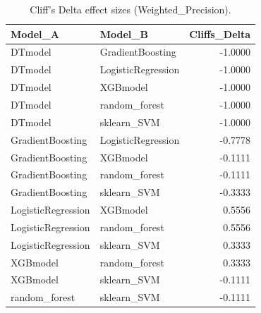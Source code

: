\begin{table}[t]
\centering
\begin{tabular}{llr}
\toprule
Model_A & Model_B & Cliffs_Delta \\
\midrule
DTmodel & GradientBoosting & -1.0000 \\
DTmodel & LogisticRegression & -1.0000 \\
DTmodel & XGBmodel & -1.0000 \\
DTmodel & random_forest & -1.0000 \\
DTmodel & sklearn_SVM & -1.0000 \\
GradientBoosting & LogisticRegression & -0.7778 \\
GradientBoosting & XGBmodel & -0.1111 \\
GradientBoosting & random_forest & -0.1111 \\
GradientBoosting & sklearn_SVM & -0.3333 \\
LogisticRegression & XGBmodel & 0.5556 \\
LogisticRegression & random_forest & 0.5556 \\
LogisticRegression & sklearn_SVM & 0.3333 \\
XGBmodel & random_forest & 0.3333 \\
XGBmodel & sklearn_SVM & -0.1111 \\
random_forest & sklearn_SVM & -0.1111 \\
\bottomrule
\end{tabular}
\caption{Cliff's Delta effect sizes (Weighted_Precision).}
\label{tab:cliffs_Weighted_Precision}
\end{table}